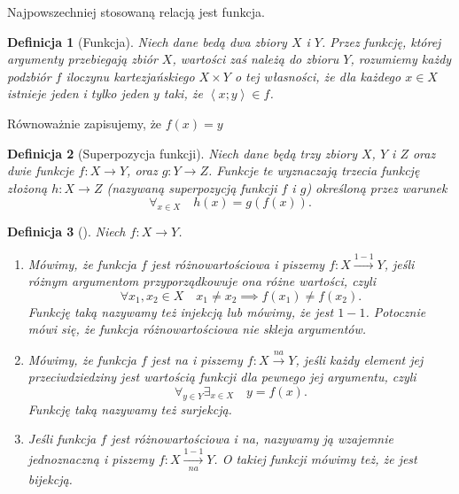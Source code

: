 \documentclass[12pt,a4paper]{report}
\newtheorem{definition}{Definicja}[chapter]
\newcommand{\parauporzadkowana}[2]{\left\langle {#1}; {#2} \right\rangle}
\begin{document}
Najpowszechniej stosowaną relacją jest funkcja.

\begin{definition}[Funkcja\citep{kuratowski1966wstkep}]
Niech dane bedą dwa zbiory $X$ i $Y$. Przez funkcję, której argumenty przebiegają zbiór $X$, wartości zaś należą do zbioru $Y$, rozumiemy każdy podzbiór $f$ iloczynu kartezjańskiego $X \times Y$ o tej własności, że dla każdego $x \in X$ istnieje jeden i tylko jeden $y$ taki, że $\parauporzadkowana{x}{y} \in f$. 

\end{definition}

Równoważnie zapisujemy, że $f(x)=y$

\begin{definition}[Superpozycja funkcji\citep{kuratowski1966wstkep}]
Niech dane będą trzy zbiory $X$, $Y$ i $Z$ oraz dwie funkcje $f:X\to Y$, oraz $g:Y\to Z$. Funkcje te wyznaczają trzecia funkcję złożoną $h:X\to Z$ (nazywaną superpozycją funkcji $f$ i $g$) określoną przez warunek
\begin{equation*}
\forall_{x \in X} \quad h(x)=g(f(x)).
\end{equation*}
\end{definition}

\begin{definition}[\citep{kraszewski2007wstkep}]
Niech $f:X \to Y$.
\begin{enumerate}
\item
Mówimy, że funkcja $f$ jest różnowartościowa i piszemy $f:X\xrightarrow{1-1} Y$, jeśli różnym argumentom przyporządkowuje ona różne wartości, czyli
\begin{equation*}
\forall{x_{1},x_{2}}\in X \quad x_{1}\ne x_{2} \implies f(x_{1})\ne f(x_{2}).
\end{equation*}
Funkcję taką nazywamy też injekcją lub mówimy, że jest $1-1$. Potocznie mówi się, że funkcja różnowartościowa nie skleja argumentów.
\item
Mówimy, że funkcja $f$ jest na i piszemy $f:X\xrightarrow{na}Y$, jeśli każdy element jej przeciwdziedziny jest wartością funkcji dla pewnego jej argumentu, czyli
\begin{equation*}
\forall_{y\in Y} \exists_{x\in X} \quad y=f(x).
\end{equation*}
Funkcję taką nazywamy też surjekcją.
\item
Jeśli funkcja $f$ jest różnowartościowa i na, nazywamy ją wzajemnie jednoznaczną i piszemy $f:X\xrightarrow[na]{1-1} Y$. O takiej funkcji mówimy też, że jest bijekcją.
\end{enumerate}
\end{definition}
\end{document}
